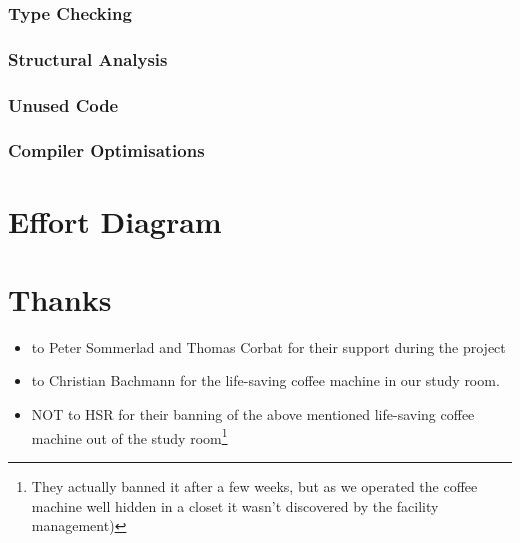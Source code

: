 \documentclass[12pt,halfparskip]{scrreprt}
\begin{document}
\subsubsection{Type Checking}
\subsubsection{Structural Analysis}
\subsubsection{Unused Code}
\subsubsection{Compiler Optimisations}

\clearpage

\section{Effort Diagram}

\clearpage

\section{Thanks}

\begin{itemize}
	\item to Peter Sommerlad and Thomas Corbat for their support during the project
	\item to Christian Bachmann for the life-saving coffee machine in our study room. 
	\item NOT to HSR for their banning of the above mentioned life-saving coffee machine out of the study room\footnote{They actually banned it after a few weeks, but as we operated the coffee machine well hidden in a closet it wasn't discovered by the facility management)}
\end{itemize}



\listoffigures



\end{document}
